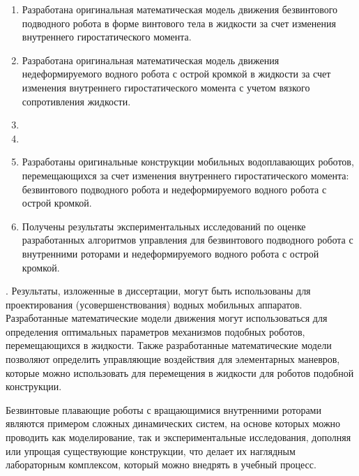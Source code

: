 {\novelty}
\begin{enumerate}
  \item Разработана оригинальная математическая модель движения безвинтового подводного робота в форме винтового тела в жидкости за счет изменения внутреннего гиростатического момента.
  \item Разработана оригинальная математическая модель движения недеформируемого водного робота с острой кромкой в жидкости за счет изменения внутреннего гиростатического момента с учетом вязкого сопротивления жидкости.
  \item {}
  \item {}
  \item Разработаны оригинальные конструкции мобильных водоплавающих роботов, перемещающихся за счет изменения внутреннего гиростатического момента: безвинтового подводного робота и недеформируемого водного робота с острой кромкой.
  \item Получены результаты экспериментальных исследований по оценке разработанных алгоритмов управления для безвинтового подводного робота с внутренними роторами и недеформируемого водного робота с острой кромкой.
\end{enumerate}

{\influence}. Результаты, изложенные в диссертации, могут быть использованы для проектирования (усовершенствования) водных мобильных аппаратов. Разработанные математические модели движения могут использоваться для определения оптимальных параметров механизмов подобных роботов, перемещающихся в жидкости. Также разработанные математические модели позволяют определить управляющие воздействия для элементарных маневров, которые можно использовать для перемещения в жидкости для роботов подобной конструкции.


Безвинтовые плавающие роботы с вращающимися внутренними роторами являются примером сложных динамических систем, на основе которых можно проводить как моделирование, так и экспериментальные исследования, дополняя или упрощая существующие конструкции, что делает их наглядным лабораторным комплексом, который можно внедрять в учебный процесс.

